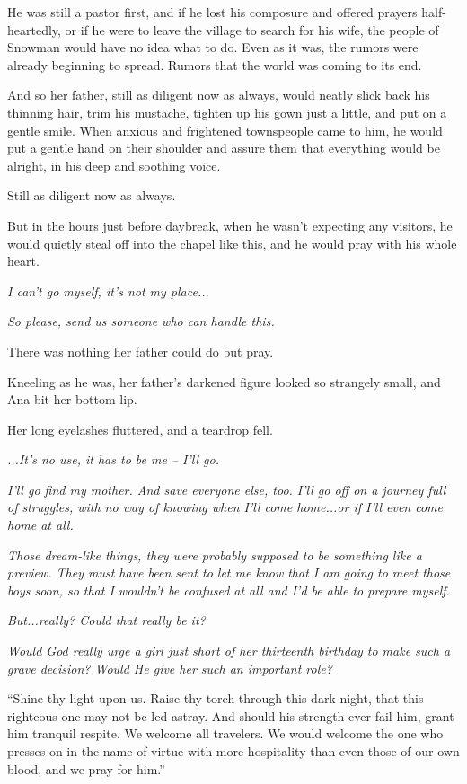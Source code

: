 \documentclass[
]{article}
\begin{document}
He was still a pastor first, and if he lost his composure and offered
prayers half-heartedly, or if he were to leave the village to search for
his wife, the people of Snowman would have no idea what to do. Even as
it was, the rumors were already beginning to spread. Rumors that the
world was coming to its end.

And so her father, still as diligent now as always, would neatly slick
back his thinning hair, trim his mustache, tighten up his gown just a
little, and put on a gentle smile. When anxious and frightened
townspeople came to him, he would put a gentle hand on their shoulder
and assure them that everything would be alright, in his deep and
soothing voice.

Still as diligent now as always.

But in the hours just before daybreak, when he wasn't expecting any
visitors, he would quietly steal off into the chapel like this, and he
would pray with his whole heart.

\emph{I can't go myself, it's not my place...}

\emph{So please, send us someone who can handle this.}

There was nothing her father could do but pray.

Kneeling as he was, her father's darkened figure looked so strangely
small, and Ana bit her bottom lip.

Her long eyelashes fluttered, and a teardrop fell.

\emph{...It's no use, it has to be me -- I'll go.}

\emph{I'll go find my mother. And save everyone else, too. I'll go off
on a journey full of struggles, with no way of knowing when I'll come
home...or if I'll even come home at all.}

\emph{Those dream-like things, they were probably supposed to be
something like a preview. They must have been sent to let me know that I
am going to meet those boys soon, so that I wouldn't be confused at all
and I'd be able to prepare myself.}

\emph{But...really? Could that really be it?}

\emph{Would God really urge a girl just short of her thirteenth birthday
to make such a grave decision? Would He give her such an important
role?}

``Shine thy light upon us. Raise thy torch through this dark night, that
this righteous one may not be led astray. And should his strength ever
fail him, grant him tranquil respite. We welcome all travelers. We would
welcome the one who presses on in the name of virtue with more
hospitality than even those of our own blood, and we pray for him.''
\end{document}
